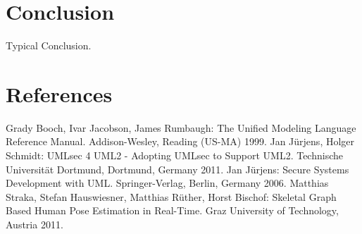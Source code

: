 \documentclass{acmtog} %
\begin{document}
\section{Conclusion}
\label{sec:conclusion}

Typical Conclusion.

\section{References}
\renewcommand{\section}[2]{}
\begin{raggedright}%
\begin{thebibliography}{X}
     Grady Booch, Ivar Jacobson, James Rumbaugh: The Unified Modeling Language Reference Manual. Addison-Wesley, Reading (US-MA) 1999.
     Jan Jürjens, Holger Schmidt: UMLsec 4 UML2 - Adopting UMLsec to Support UML2. Technische Universität Dortmund, Dortmund, Germany 2011.
     Jan Jürjens: Secure Systems Development with UML. Springer-Verlag, Berlin, Germany 2006.
     Matthias Straka, Stefan Hauswiesner, Matthias Rüther, Horst Bischof: Skeletal Graph Based Human Pose Estimation in Real-Time. Graz University of Technology, Austria 2011.
\end{thebibliography}
\end{raggedright}
\end{document}
